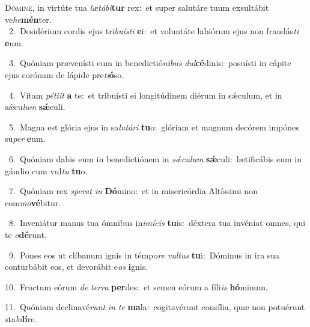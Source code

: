 \lettrine{\initial\textcolor{\initialcolor}{D}}{ómine,} in virtúte tua \textit{læ}\-\textit{tá}\textit{bi}\textbf{tur} rex:~\star et super salutáre tuum exsultábit ve\-\textit{he}\-\textbf{mén}ter.\\
{\numbfont\textcolor{\numbcolor}{~2.}}~Desidérium cordis ejus tri\-\textit{bu}\-\textit{ís}\textit{ti} \textbf{e}\-i:~\star et voluntáte labiórum ejus non fraudás\textit{ti} \textbf{e}\-um.\par
{\numbfont\textcolor{\numbcolor}{~3.}}~Quóniam prævenísti eum in benedictió\-\textit{ni}\-\textit{bus} \textit{dul}\-\textbf{cé}dinis:~\star posuísti in cápite ejus corónam de lápide pre\-\textit{ti}\-\textbf{ó}so.\par
{\numbfont\textcolor{\numbcolor}{~4.}}~Vitam \textit{pé}\-\textit{ti}\textit{it} \textbf{a} te:~\star et tribuísti ei longitúdinem diérum in sǽculum, et in sǽcu\textit{lum} \textbf{sǽ}\-culi.\par
{\numbfont\textcolor{\numbcolor}{~5.}}~Magna est glória ejus in sa\-\textit{lu}\-\textit{tá}\textit{ri} \textbf{tu}\-o:~\star glóriam et magnum decórem impónes su\textit{per} \textbf{e}\-um.\par
{\numbfont\textcolor{\numbcolor}{~6.}}~Quóniam dabis eum in benedictiónem in \textit{sǽ}\-\textit{cu}\textit{lum} \textbf{sǽ}\-culi:~\star lætificábis eum in gáudio cum vul\textit{tu} \textbf{tu}\-o.\par
{\numbfont\textcolor{\numbcolor}{~7.}}~Quóniam rex \textit{spe}\-\textit{rat} \textit{in} \textbf{Dó}\-mino:~\star et in misericórdia Altíssimi non com\-\textit{mo}\-\textbf{vé}bitur.\par
{\numbfont\textcolor{\numbcolor}{~8.}}~Inveniátur manus tua ómnibus in\-\textit{i}\-\textit{mí}\textit{cis} \textbf{tu}\-is:~\star déxtera tua invéniat omnes, qui te \textit{o}\-\textbf{dé}runt.\par
{\numbfont\textcolor{\numbcolor}{~9.}}~Pones eos ut clíbanum ignis in témpo\textit{re} \textit{vul}\-\textit{tus} \textbf{tu}\-i:~\star Dóminus in ira sua conturbábit eos, et devorábit e\textit{os} \textbf{i}\-gnis.\par
{\numbfont\textcolor{\numbcolor}{10.}}~Fructum eórum \textit{de} \textit{ter}\-\textit{ra} \textbf{per}\-des:~\star et semen eórum a fíli\textit{is} \textbf{hó}\-minum.\par
{\numbfont\textcolor{\numbcolor}{11.}}~Quóniam declinavé\textit{runt} \textit{in} \textit{te} \textbf{ma}\-la:~\star cogitavérunt consília, quæ non potuérunt sta\-\textit{bi}\-\textbf{lí}re.\par
